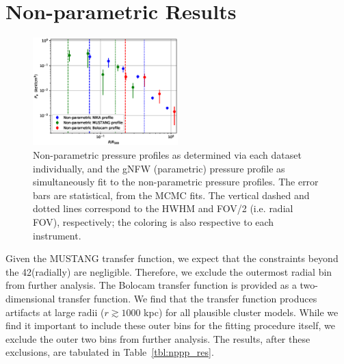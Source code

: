 \documentclass[twocolumn,traditabstract]{aa}
\begin{document}
\section{Non-parametric Results}
\label{sec:np_res}

\begin{figure}[!h]
  \centering
  \includegraphics[width=0.5\textwidth]{NIKA_ml_deproj_figs/Real_Joint_gNFW_Real_11011111_2500S_500B_100W_non_parametric_pressure.eps}
  \caption{Non-parametric pressure profiles as determined via each dataset individually, and the gNFW (parametric)
    pressure profile as simultaneously fit to the non-parametric pressure profiles. The error bars are statistical,
    from the MCMC fits. The vertical dashed and dotted
    lines correspond to the HWHM and FOV/2 (i.e. radial FOV), respectively; the coloring is also respective to each
    instrument.}
  \label{fig:joint_pressure}
\end{figure}

Given the MUSTANG transfer function, we expect that the constraints beyond the 42\asecs (radially) are negligible. Therefore,
we exclude the outermost radial bin from further analysis.
The Bolocam transfer function is provided as a two-dimensional transfer function. We find that the transfer function produces
artifacts at large radii ($r \gtrsim 1000$ kpc) for all plausible cluster models. While we find it important to include these
outer bins for the fitting procedure itself, we exclude the outer two bins from further analysis. The results, after these
exclusions, are tabulated in Table~\ref{tbl:nppp_res}.


\end{document}
